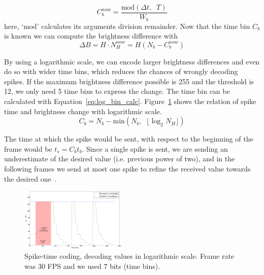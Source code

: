 \documentclass[conference]{IEEEtran}
\begin{document}
\begin{equation}
C^{now}_{b} = \frac{ \mathrm{mod}\left(\Delta t, \;\; T\right) }{ W_{b} }
\label{eq:bin_compute}
\end{equation}
here, `$\mathrm{mod}$' calculates its arguments division remainder. Now that the time bin $C_{b}$ is known we can compute the brightness difference with
\begin{equation}
 \Delta B = H\cdot N_{H}^{now} =  H\left(N_{b} - C^{now}_{b}\right) 
 \label{eq:new_Nh_linear}
\end{equation}

By using a logarithmic scale, we can encode larger brightness differences and even do so with wider time bins, which reduces the chances of wrongly decoding spikes. If the maximum brightness difference possible is 255 and the threshold is 12, we only need 5 time bins to express the change. 
The time bin can be calculated with Equation~\ref{eq:log_bin_calc}. Figure~\ref{fig:exponential_time} shows the relation of spike time and brightness change with logarithmic scale.
\begin{equation}
\label{eq:log_bin_calc}
C_{b} = N_{b} - \mathrm{min}\left( N_{b}, \;\; \lfloor\log_{2} N_{H}\rfloor \right) 
\end{equation}

The time at which the spike would be sent, with respect to the beginning of the frame would be $t_{s} = C_{b}t_{b}$.
Since a single spike is sent, we are sending an underestimate of the desired value (i.e. previous power of two), and in the following frames we send at most one spike to refine the received value towards the desired one~\cite{sardac}. 

\begin{figure}[htb]
  \centering
  \includegraphics[width=0.45\textwidth]{spike_values_exp}
  
  \caption{Spike-time coding, decoding values in logarithmic scale. Frame rate was 30 FPS and we used 7 bits (time bins). }
  \label{fig:exponential_time}
\end{figure} 
\end{document}
